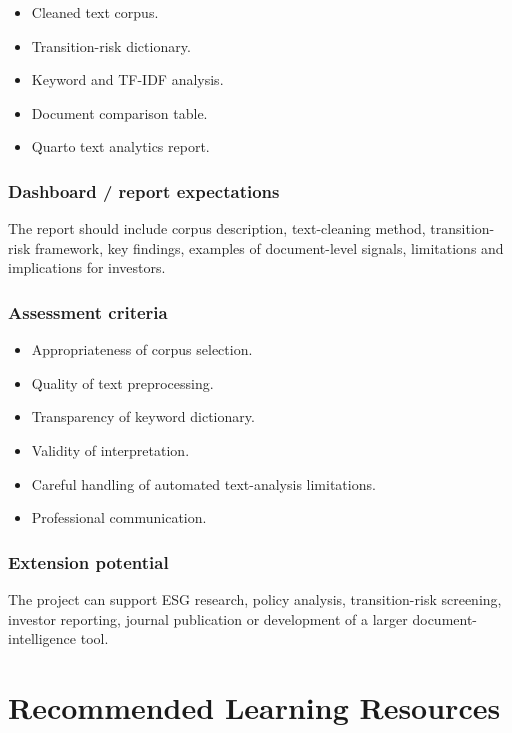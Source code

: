 \documentclass[
  a4paper,
]{article}
\providecommand{\tightlist}{%
  \setlength{\itemsep}{0pt}\setlength{\parskip}{0pt}}
\begin{document}
\begin{itemize}
\tightlist
\item
  Cleaned text corpus.
\item
  Transition-risk dictionary.
\item
  Keyword and TF-IDF analysis.
\item
  Document comparison table.
\item
  Quarto text analytics report.
\end{itemize}

\subsubsection{Dashboard / report
expectations}\label{dashboard-report-expectations-3}

The report should include corpus description, text-cleaning method,
transition-risk framework, key findings, examples of document-level
signals, limitations and implications for investors.

\subsubsection{Assessment criteria}\label{assessment-criteria-3}

\begin{itemize}
\tightlist
\item
  Appropriateness of corpus selection.
\item
  Quality of text preprocessing.
\item
  Transparency of keyword dictionary.
\item
  Validity of interpretation.
\item
  Careful handling of automated text-analysis limitations.
\item
  Professional communication.
\end{itemize}

\subsubsection{Extension potential}\label{extension-potential-3}

The project can support ESG research, policy analysis, transition-risk
screening, investor reporting, journal publication or development of a
larger document-intelligence tool.

\section{Recommended Learning
Resources}\label{recommended-learning-resources}
\end{document}
